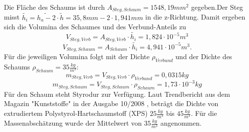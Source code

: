Die Fläche des Schaums ist durch $ A_{Steg,Schaum}=1548,19mm^{2} $ gegeben.Der Steg misst $ \tilde{h_{i}}=\tilde{h_{a}-2}\cdot\tilde{h}=35,8mm-2\cdot1,941mm $ in die z-Richtung. Damit ergeben sich die Volumina des Schaumes und des Verbund-Anteils zu
\begin{equation}
	V_{Steg,Verb}=A_{Steg,Verb}\cdot\tilde{h_{i}}=1,824\cdot10^{-5}m^{3}
\end{equation}
\begin{equation}
	V_{Steg,Schaum}=A_{Schaum}\cdot\tilde{h_{i}}=4,941\cdot10^{-5}m^{3}.
\end{equation}
Für die jeweiligen Volumina folgt mit der Dichte $ \rho_{Verbund} $ und der Dichte des Schaums $ \rho_{Schaum}=35\frac{kg}{m^{3}} $:
\begin{equation}
	m_{Steg,Verb}=V_{Steg,Verb}\cdot\rho_{Verbund}=0,0315kg
\end{equation}
\begin{equation}
		m_{Steg,Schaum}=V_{Steg,Schaum}\cdot\rho_{Schaum}=1,73\cdot10^{-3}kg
\end{equation}
Für den Schaum steht Styrodur zur Verfügung. Laut Trendbericht aus dem Magazin "Kunststoffe" in der Ausgabe 10/2008 \cite{item7}, beträgt die Dichte von extrudiertem Polystyrol-Hartschaumstoff (XPS) $ 25\frac{kg}{m^{3}} $ bis $ 45\frac{kg}{m^{3}} $. Für die Massenabschätzung wurde der Mittelwert von $ 35\frac{kg}{m^{3}} $ angenommen.


